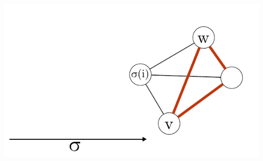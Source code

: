 \documentclass[xcolor=x11names,compress]{beamer}
\begin{document}
\begin{frame}
\begin{center}
\begin{overprint}
			\includegraphics[scale=1.0]{img/graph/q/02-04.pdf}
		\end{overprint}
	\end{center}
\end{frame}
\end{document}
